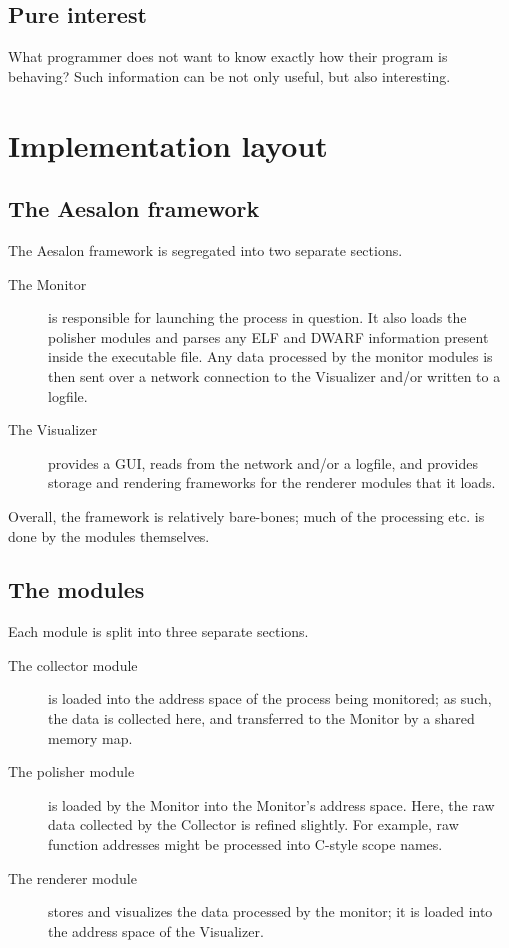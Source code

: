 \documentclass[a4paper,10pt]{report}
\begin{document}
\subsection{Pure interest}
What programmer does not want to know exactly how their program is behaving? Such information can be
not only useful, but also interesting.

\section{Implementation layout}
\subsection{The Aesalon framework}
The Aesalon framework is segregated into two separate sections.
\flushleft
\begin{description}
 \item[\textnormal{The} Monitor] is responsible for launching the process in question. It also loads the polisher modules
  and parses any ELF and DWARF information present inside the executable file. Any data processed by the
  monitor modules is then sent over a network connection to the Visualizer and/or written to a logfile.
 \item[\textnormal{The} Visualizer] provides a GUI, reads from the network and/or a logfile, and provides storage and rendering
  frameworks for the renderer modules that it loads.
\end{description}

Overall, the framework is relatively bare-bones; much of the processing etc. is done by the modules themselves.

\subsection{The modules}
Each module is split into three separate sections.
\flushleft
\begin{description}
 \item[\textnormal{The} collector module] is loaded into the address space of the process being monitored; as such, the
  data is collected here, and transferred to the Monitor by a shared memory map.
 \item[\textnormal{The} polisher module] is loaded by the Monitor into the Monitor's address space. Here, the raw data collected
  by the Collector is refined slightly. For example, raw function addresses might be processed into C-style
  scope names.
 \item[\textnormal{The} renderer module] stores and visualizes the data processed by the monitor; it is loaded into the address
  space of the Visualizer.
\end{description}
\end{document}
